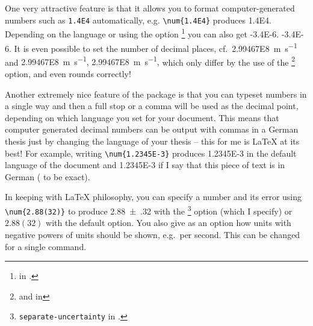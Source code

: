 One very attractive feature is
that it allows you to format computer-generated numbers such as
\verb+1.4E4+ automatically, e.g. \verb+\num{1.4E4}+ produces
\num{1.4E4}. Depending on the language or using the option
\footnote{ in .} you can also get
 {%
  \num[expproduct=cdot]{-3.4E-6}.
}{%
  \num[exponent-product=\cdot]{-3.4E-6}.
}
It is even possible to set the number of decimal places, cf.\
\SI{2.99467E8}{\metre\per\second} and
 {%
  \SI[dp=1]{2.99467E8}{\metre\per\second},
}{%
  \SI[round-mode=places,round-precision=1]{2.99467E8}{\metre\per\second},
}
which only differ by the use of the
\footnote{ and
   in } option, and even rounds
correctly!

Another extremely nice feature of the package is that you can typeset
numbers in a single way and then a full stop or a comma will be used
as the decimal point, depending on which language you set for your
document. This means that computer generated decimal numbers can be
output with commas in a German thesis just by changing the language of
your thesis -- this for me is \LaTeX{} at its best! For example,
writing \verb+\num{1.2345E-3}+ produces \num{1.2345E-3} in the default
language of the document and
\foreignlanguage{ngerman}{\num{1.2345E-3}} if I say that this piece of
text is in German (\Option{ngerman} to be exact).

In keeping with \LaTeX{} philosophy, you can specify a number and its
error using \verb+\num{2.88(32)}+ to produce \num{2.88(32)} with the
\Option{seperr}\footnote{\texttt{separate-uncertainty}
  in .} option (which I specify) or $2.88(32)$ with the
default option. You also give as an option how units with negative
powers of units should be shown, e.g.\ per second. This can be changed
for a single command.

